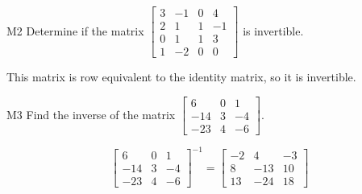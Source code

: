 \documentclass{sbgLAquiz}
\begin{document}
\begin{problem}{M2}
Determine if the matrix $\begin{bmatrix} 3 & -1 & 0 & 4 \\ 2 & 1 & 1 & -1 \\ 0 & 1 & 1 & 3 \\ 1 & -2 & 0 & 0 \end{bmatrix}$ is invertible.
\end{problem}
\begin{solution}
This matrix is row equivalent to the identity matrix, so it is invertible.
\end{solution}

\begin{extract}\newpage\end{extract}
\begin{problem}{M3} Find the inverse of the matrix $\begin{bmatrix} 6 & 0 & 1 \\ -14 & 3 & -4 \\ -23 & 4 & -6\end{bmatrix}$.
\end{problem}
\begin{solution}
$$\begin{bmatrix} 6 & 0 & 1 \\ -14 & 3 & -4 \\ -23 & 4 & -6\end{bmatrix}^{-1} = \begin{bmatrix} -2 & 4 & -3 \\ 8 & -13 & 10 \\ 13 & -24 & 18 \end{bmatrix}$$
\end{solution}
\end{document}

